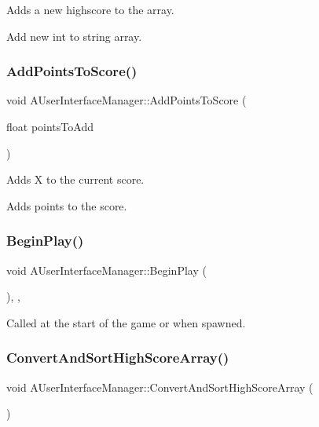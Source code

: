Adds a new highscore to the array. 

Add new int to string array. \mbox{\label{class_a_user_interface_manager_a9561409c4db7eb127ae67ea03036725c}} 
\subsubsection{AddPointsToScore()}
{\footnotesize\ttfamily void A\+User\+Interface\+Manager\+::\+Add\+Points\+To\+Score (\begin{DoxyParamCaption}\item[{float}]{points\+To\+Add }\end{DoxyParamCaption})}



Adds X to the current score. 

Adds points to the score. \mbox{\label{class_a_user_interface_manager_a086ad1333d930c01bb0a64e324085e56}} 
\subsubsection{BeginPlay()}
{\footnotesize\ttfamily void A\+User\+Interface\+Manager\+::\+Begin\+Play (\begin{DoxyParamCaption}{ }\end{DoxyParamCaption})\hspace{0.3cm}{\ttfamily [override]}, {\ttfamily [protected]}, {\ttfamily [virtual]}}



Called at the start of the game or when spawned. 

\mbox{\label{class_a_user_interface_manager_af1a58dc6b34721339b356b53efb54e45}} 
\subsubsection{ConvertAndSortHighScoreArray()}
{\footnotesize\ttfamily void A\+User\+Interface\+Manager\+::\+Convert\+And\+Sort\+High\+Score\+Array (\begin{DoxyParamCaption}{ }\end{DoxyParamCaption})}



